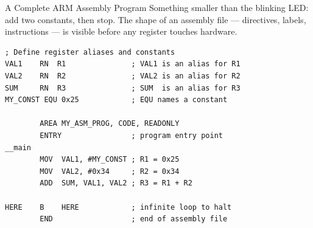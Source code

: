 \documentclass[9pt,aspectratio=169,xcolor=table]{beamer}
\begin{document}
\begin{frame}[fragile]{A Complete ARM Assembly Program}
    \leavevmode
    {\small Something smaller than the blinking LED: add two constants,
    then stop. The \alert{shape} of an assembly file --- directives,
    labels, instructions --- is visible before any register touches
    hardware.}

    \vspace{2mm}
    \begin{center}
    \begin{lstlisting}[style=armasm, language=ARM, basicstyle=\footnotesize\ttfamily]
; Define register aliases and constants
VAL1    RN  R1               ; VAL1 is an alias for R1
VAL2    RN  R2               ; VAL2 is an alias for R2
SUM     RN  R3               ; SUM  is an alias for R3
MY_CONST EQU 0x25            ; EQU names a constant

        AREA MY_ASM_PROG, CODE, READONLY
        ENTRY                ; program entry point
__main
        MOV  VAL1, #MY_CONST ; R1 = 0x25
        MOV  VAL2, #0x34     ; R2 = 0x34
        ADD  SUM, VAL1, VAL2 ; R3 = R1 + R2

HERE    B    HERE            ; infinite loop to halt
        END                  ; end of assembly file
    \end{lstlisting}
    \end{center}
\end{frame}
\end{document}
